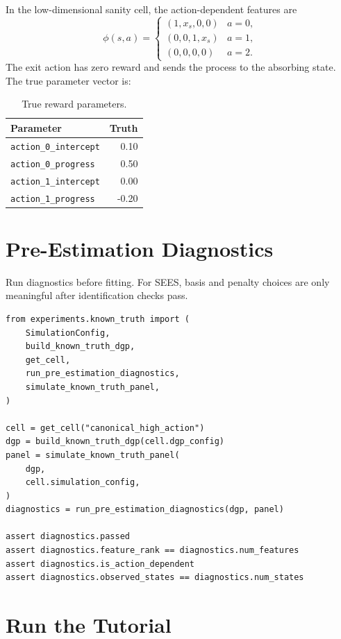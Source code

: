 \documentclass[10pt]{article}
\begin{document}
In the low-dimensional sanity cell, the action-dependent features are
\[
\phi(s,a)
=
\begin{cases}
(1, x_s, 0, 0) & a = 0,\\
(0, 0, 1, x_s) & a = 1,\\
(0, 0, 0, 0) & a = 2.
\end{cases}
\]
The exit action has zero reward and sends the process to the absorbing state.
The true parameter vector is:

\begin{table}[H]
\centering\small
\caption{True reward parameters.}
\begin{tabular}{lr}
\toprule
Parameter & Truth \\
\midrule
\texttt{action\_0\_intercept} & 0.10 \\
\texttt{action\_0\_progress} & 0.50 \\
\texttt{action\_1\_intercept} & 0.00 \\
\texttt{action\_1\_progress} & -0.20 \\
\bottomrule
\end{tabular}
\end{table}

\section{Pre-Estimation Diagnostics}

Run diagnostics before fitting. For SEES, basis and penalty choices are only
meaningful after identification checks pass.

\begin{lstlisting}
from experiments.known_truth import (
    SimulationConfig,
    build_known_truth_dgp,
    get_cell,
    run_pre_estimation_diagnostics,
    simulate_known_truth_panel,
)

cell = get_cell("canonical_high_action")
dgp = build_known_truth_dgp(cell.dgp_config)
panel = simulate_known_truth_panel(
    dgp,
    cell.simulation_config,
)
diagnostics = run_pre_estimation_diagnostics(dgp, panel)

assert diagnostics.passed
assert diagnostics.feature_rank == diagnostics.num_features
assert diagnostics.is_action_dependent
assert diagnostics.observed_states == diagnostics.num_states
\end{lstlisting}

\section{Run the Tutorial}
\end{document}
